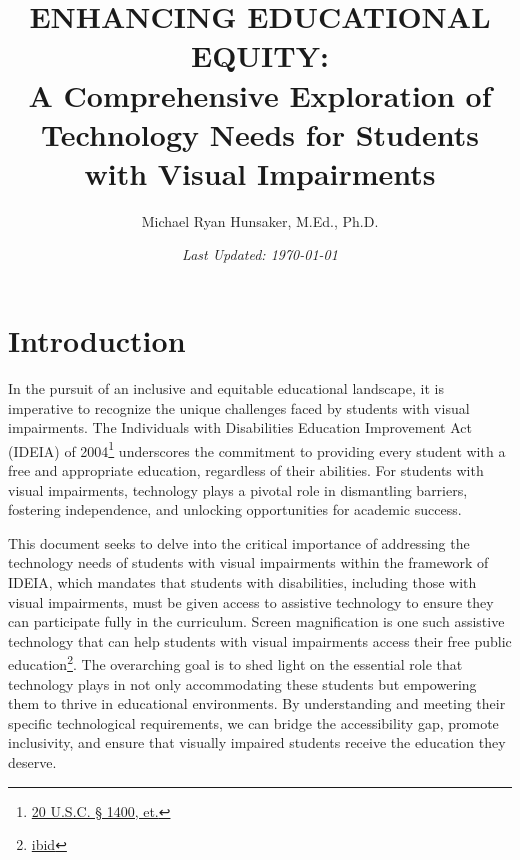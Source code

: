 \documentclass[14pt,letterpaper,twoside]{extreport}
\title{\Huge ENHANCING EDUCATIONAL EQUITY: \\ \Large A Comprehensive Exploration of Technology Needs for Students with Visual Impairments}
\author{Michael Ryan Hunsaker, M.Ed., Ph.D.}
\date{\vfill \textit{Last Updated: {\today}}}
\begin{document}
\maketitle
{}
\setcounter{tocdepth}{1}
\cleardoublepage
{}
\tableofcontents
{\listoffigures\let\clearpage\relax\vskip0pt\listoftables}
\newpage{}
\fancyhead{}
\fancyfoot{}


\hypertarget{intro}{}\chapter*{Introduction}\label{intro}
\pagestyle{fancyplain}       
\fancyfoot[C]{\thepage}
In the pursuit of an inclusive and equitable educational landscape, it is imperative to recognize the unique challenges faced by students with visual impairments. The Individuals with Disabilities Education Improvement Act (IDEIA) of 2004\footnote{\href{https://sites.ed.gov/idea/statuteregulations/}{20 U.S.C. § 1400, et.}} underscores the commitment to providing every student with a free and appropriate education, regardless of their abilities. For students with visual impairments, technology plays a pivotal role in dismantling barriers, fostering independence, and unlocking opportunities for academic success.

This document seeks to delve into the critical importance of addressing the technology needs of students with visual impairments within the framework of IDEIA, which mandates that students with disabilities, including those with visual impairments, must be given access to assistive technology to ensure they can participate fully in the curriculum. Screen magnification is one such assistive technology that can help students with visual impairments access their free public education\footnote{\href{https://sites.ed.gov/idea/statuteregulations/}{ibid}}. The overarching goal is to shed light on the essential role that technology plays in not only accommodating these students but empowering them to thrive in educational environments. By understanding and meeting their specific technological requirements, we can bridge the accessibility gap, promote inclusivity, and ensure that visually impaired students receive the education they deserve.
\end{document}
